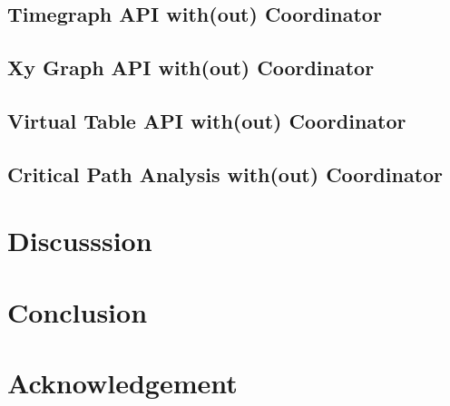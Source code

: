 \subsection{Timegraph API with(out) Coordinator}

\subsection{Xy Graph API with(out) Coordinator}

\subsection{Virtual Table API with(out) Coordinator}

\subsection{Critical Path Analysis with(out) Coordinator}

\section{Discusssion}

\section{Conclusion}

\section{Acknowledgement}